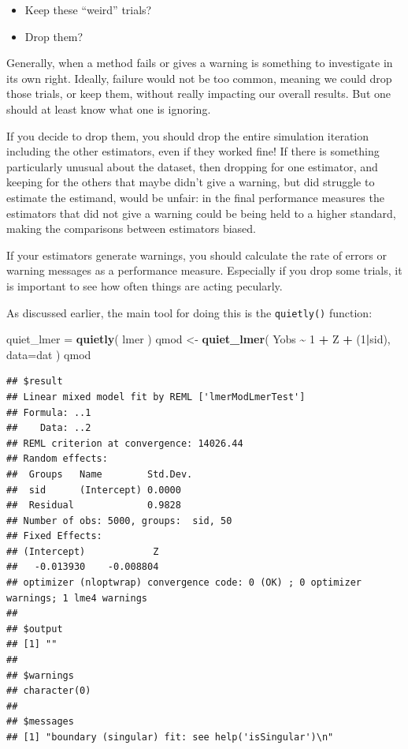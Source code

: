 \documentclass[
]{book}
\newenvironment{Shaded}{\begin{snugshade}}{\end{snugshade}}
\newcommand{\AttributeTok}[1]{\textcolor[rgb]{0.13,0.29,0.53}{#1}}
\newcommand{\DecValTok}[1]{\textcolor[rgb]{0.00,0.00,0.81}{#1}}
\newcommand{\FunctionTok}[1]{\textcolor[rgb]{0.13,0.29,0.53}{\textbf{#1}}}
\newcommand{\NormalTok}[1]{#1}
\newcommand{\OtherTok}[1]{\textcolor[rgb]{0.56,0.35,0.01}{#1}}
\newcommand{\SpecialCharTok}[1]{\textcolor[rgb]{0.81,0.36,0.00}{\textbf{#1}}}
\providecommand{\tightlist}{%
  \setlength{\itemsep}{0pt}\setlength{\parskip}{0pt}}
\begin{document}
\begin{itemize}
\tightlist
\item
  Keep these ``weird'' trials?
\item
  Drop them?
\end{itemize}

Generally, when a method fails or gives a warning is something to investigate in its own right.
Ideally, failure would not be too common, meaning we could drop those trials, or keep them, without really impacting our overall results.
But one should at least know what one is ignoring.

If you decide to drop them, you should drop the entire simulation iteration including the other estimators, even if they worked fine!
If there is something particularly unusual about the dataset, then dropping for one estimator, and keeping for the others that maybe didn't give a warning, but did struggle to estimate the estimand, would be unfair: in the final performance measures the estimators that did not give a warning could be being held to a higher standard, making the comparisons between estimators biased.

If your estimators generate warnings, you should calculate the rate of errors or warning messages as a performance measure.
Especially if you drop some trials, it is important to see how often things are acting pecularly.

As discussed earlier, the main tool for doing this is the \texttt{quietly()} function:

\begin{Shaded}
\begin{Highlighting}[]
\NormalTok{quiet\_lmer }\OtherTok{=} \FunctionTok{quietly}\NormalTok{( lmer )}
\NormalTok{qmod }\OtherTok{\textless{}{-}} \FunctionTok{quiet\_lmer}\NormalTok{( Yobs }\SpecialCharTok{\textasciitilde{}} \DecValTok{1} \SpecialCharTok{+}\NormalTok{ Z }\SpecialCharTok{+}\NormalTok{ (}\DecValTok{1}\SpecialCharTok{|}\NormalTok{sid), }\AttributeTok{data=}\NormalTok{dat )}
\NormalTok{qmod}
\end{Highlighting}
\end{Shaded}

\begin{verbatim}
## $result
## Linear mixed model fit by REML ['lmerModLmerTest']
## Formula: ..1
##    Data: ..2
## REML criterion at convergence: 14026.44
## Random effects:
##  Groups   Name        Std.Dev.
##  sid      (Intercept) 0.0000  
##  Residual             0.9828  
## Number of obs: 5000, groups:  sid, 50
## Fixed Effects:
## (Intercept)            Z  
##   -0.013930    -0.008804  
## optimizer (nloptwrap) convergence code: 0 (OK) ; 0 optimizer warnings; 1 lme4 warnings 
## 
## $output
## [1] ""
## 
## $warnings
## character(0)
## 
## $messages
## [1] "boundary (singular) fit: see help('isSingular')\n"
\end{verbatim}
\end{document}
